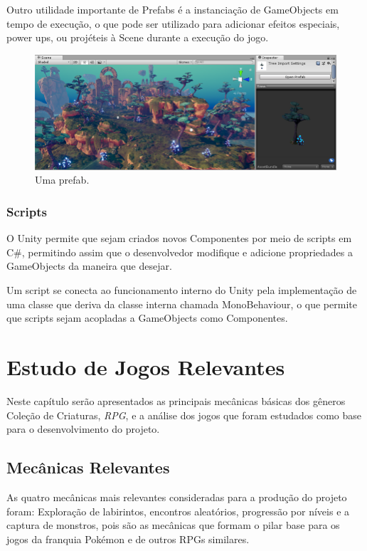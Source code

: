 	Outro utilidade importante de Prefabs é a instanciação de GameObjects em tempo de execução, o que pode ser utilizado para adicionar efeitos especiais, power ups, ou projéteis à Scene durante a execução do jogo.
\begin{figure}
  \includegraphics[width=\linewidth]{prefab.jpg}
  \caption{Uma prefab.}
  \label{fig:prefab}
\end{figure}	

\subsection{Scripts}

O Unity permite que sejam criados novos Componentes por meio de scripts em C\#, permitindo assim que o desenvolvedor modifique e adicione propriedades a GameObjects da maneira que desejar.

Um script se conecta ao funcionamento interno do Unity pela implementação de uma classe que deriva da classe interna chamada MonoBehaviour, o que permite que scripts sejam acopladas a GameObjects como Componentes.

\chapter{Estudo de Jogos Relevantes}

Neste capítulo serão apresentados as principais mecânicas básicas dos gêneros Coleção de Criaturas, \emph{RPG}, e a análise dos jogos que foram estudados como base para o desenvolvimento do projeto. 


\section{Mecânicas Relevantes}

As quatro mecânicas mais relevantes consideradas para a produção do projeto foram: Exploração de labirintos, encontros aleatórios, progressão por níveis e a captura de monstros, pois são as mecânicas que formam o pilar base para os jogos da franquia Pokémon e de outros RPGs similares.

